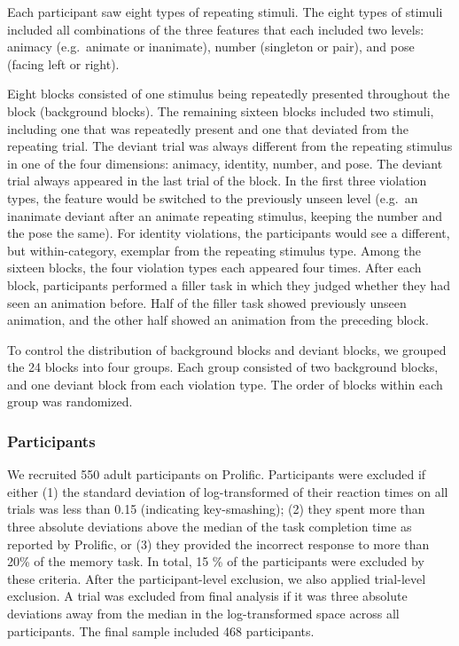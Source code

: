 \documentclass[10pt, letterpaper]{article}
\begin{document}
Each participant saw eight types of repeating stimuli. The eight types
of stimuli included all combinations of the three features that each
included two levels: animacy (e.g.~animate or inanimate), number
(singleton or pair), and pose (facing left or right).

Eight blocks consisted of one stimulus being repeatedly presented
throughout the block (background blocks). The remaining sixteen blocks
included two stimuli, including one that was repeatedly present and one
that deviated from the repeating trial. The deviant trial was always
different from the repeating stimulus in one of the four dimensions:
animacy, identity, number, and pose. The deviant trial always appeared
in the last trial of the block. In the first three violation types, the
feature would be switched to the previously unseen level (e.g.~an
inanimate deviant after an animate repeating stimulus, keeping the
number and the pose the same). For identity violations, the participants
would see a different, but within-category, exemplar from the repeating
stimulus type. Among the sixteen blocks, the four violation types each
appeared four times. After each block, participants performed a filler
task in which they judged whether they had seen an animation before.
Half of the filler task showed previously unseen animation, and the
other half showed an animation from the preceding block.

To control the distribution of background blocks and deviant blocks, we
grouped the 24 blocks into four groups. Each group consisted of two
background blocks, and one deviant block from each violation type. The
order of blocks within each group was randomized.

\hypertarget{participants}{%
\subsubsection{Participants}\label{participants}}

We recruited 550 adult participants on Prolific. Participants were
excluded if either (1) the standard deviation of log-transformed of
their reaction times on all trials was less than 0.15 (indicating
key-smashing); (2) they spent more than three absolute deviations above
the median of the task completion time as reported by Prolific, or (3)
they provided the incorrect response to more than 20\% of the memory
task. In total, 15 \% of the participants were excluded by these
criteria. After the participant-level exclusion, we also applied
trial-level exclusion. A trial was excluded from final analysis if it
was three absolute deviations away from the median in the
log-transformed space across all participants. The final sample included
468 participants.
\end{document}
